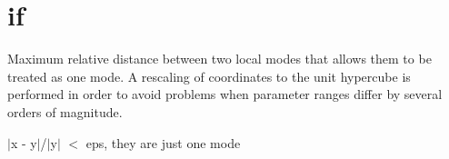 \hypertarget{if-example}{
\section{if}
}
Maximum relative distance between two local modes that allows them to be treated as one mode. A rescaling of coordinates to the unit hypercube is performed in order to avoid problems when parameter ranges differ by several orders of magnitude.

$|$x -\/ y$|$/$|$y$|$ $<$ eps, they are just one mode


\begin{DoxyCodeInclude}
\end{DoxyCodeInclude}
 